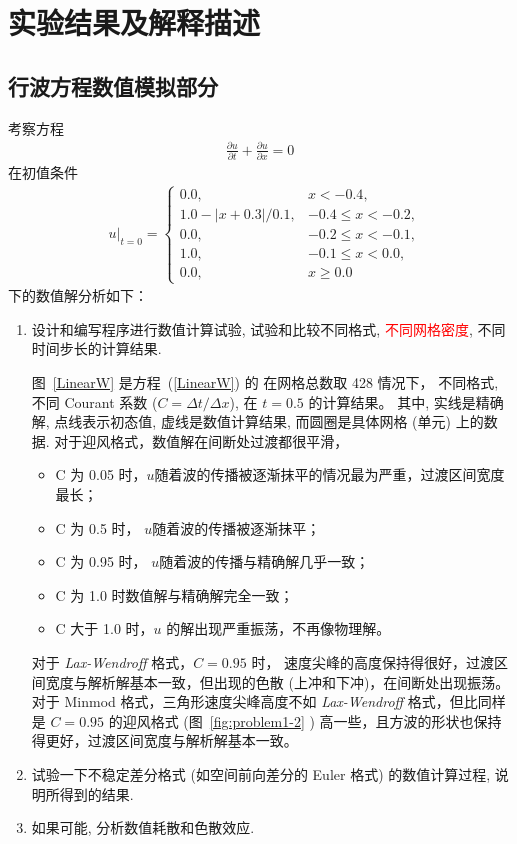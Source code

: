 \documentclass[10.5pt
]{article}
\begin{document}
\section{实验结果及解释描述}
\subsection{行波方程数值模拟部分}
考察方程
\begin{align}
\frac{\partial u}{\partial t} + \frac{\partial u}{\partial x} = 0
\end{align}
在初值条件
\begin{align}
& u|_{t=0} = \left\{\begin{array}{ll} 0.0, & x < -0.4, \\
1.0 - |x + 0.3| / 0.1, & -0.4 \le x < -0.2, \\
0.0, & -0.2 \le x < -0.1, \\
1.0 , & -0.1 \le x < 0.0, \\
0.0, & x \ge 0.0
\end{array}\right.
\end{align}
下的数值解分析如下：

\begin{enumerate}
\item
	设计和编写程序进行数值计算试验, 试验和比较不同格式, \textcolor{red}{不同网格密度}, 不同时间步长的计算结果.

图~\ref{LinearW} 是方程~(\ref{LinearW}) 的
在网格总数取 428 情况下，
不同格式, 不同 Courant 系数 ($C = \Delta t / \Delta x$), 在 $t = 0.5$ 的计算结果。
其中, 实线是精确解, 点线表示初态值, 虚线是数值计算结果, 而圆圈是具体网格 (单元) 上的数据. 
对于迎风格式，数值解在间断处过渡都很平滑，
\begin{itemize}
	\item C 为 0.05 时，$u$随着波的传播被逐渐抹平的情况最为严重，过渡区间宽度最长；
	\item C 为 0.5 时， $u$随着波的传播被逐渐抹平；
	\item C 为 0.95 时， $u$随着波的传播与精确解几乎一致；
	\item C 为 1.0 时数值解与精确解完全一致；
	\item C 大于 1.0 时，$u$ 的解出现严重振荡，不再像物理解。
\end{itemize}
对于 \textit{Lax-Wendroff} 格式，$C=0.95$ 时， 速度尖峰的高度保持得很好，过渡区间宽度与解析解基本一致，但出现的色散 (上冲和下冲)，在间断处出现振荡。
对于 Minmod 格式，三角形速度尖峰高度不如 \textit{Lax-Wendroff} 格式，但比同样是 $C = 0.95$ 的迎风格式 (图~\ref{fig:problem1-2} ) 高一些，且方波的形状也保持得更好，过渡区间宽度与解析解基本一致。

\item
 {\color{red} 试验一下不稳定差分格式 (如空间前向差分的 Euler 格式) 的数值计算过程, 说明所得到的结果.}
\item
  { \color{red} 如果可能, 分析数值耗散和色散效应.}
\end{enumerate}
\end{document}
